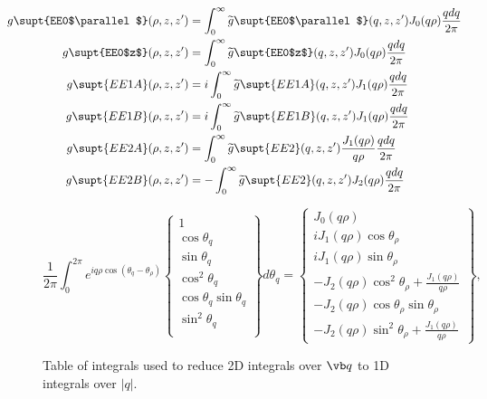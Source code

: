 \documentclass[letterpaper]{article}
\renewcommand{\wt}{\widetilde}
\begin{document}
\begin{align*}
g\supt{EE0$\parallel$}(\rho,z,z^\prime)
&= \int_0^\infty
   \wt{g}\supt{EE0$\parallel$}(q, z, z^\prime)
   J_0(q\rho) \frac{q dq}{2\pi}
\\
g\supt{EE0$z$}(\rho,z,z^\prime)
&=\int_0^\infty 
  \wt{g}\supt{EE0$z$}(q, z, z^\prime) J_0(q\rho) \frac{q dq}{2\pi} 
\\
g\supt{EE1A}(\rho,z,z^\prime)
&= i\int_0^\infty
   \wt{g}\supt{EE1A}(q, z, z^\prime)
   J_1(q\rho) \frac{q dq}{2\pi}
\\
g\supt{EE1B}(\rho,z,z^\prime)
&= i\int_0^\infty
   \wt{g}\supt{EE1B}(q, z, z^\prime)
   J_1(q\rho) \frac{q dq}{2\pi}
\\
g\supt{EE2A}(\rho,z,z^\prime)
&= \int_0^\infty
   \wt{g}\supt{EE2}(q, z, z^\prime)
   \frac{J_1(q\rho)}{q\rho} \frac{q dq}{2\pi}
\\
g\supt{EE2B}(\rho,z,z^\prime)
&= -\int_0^\infty
    \wt{g}\supt{EE2}(q, z, z^\prime)
    J_2(q\rho) \frac{q dq}{2\pi}
\end{align*}

\begin{figure}
$$
 \frac{1}{2\pi} 
 \int_0^{2\pi} e^{i q \rho \cos(\theta_q -\theta_\rho)}
 \left\{\begin{array}{c}
 1 \\[5pt]
 \cos\theta_q \\[5pt]
 \sin\theta_q \\[5pt]
 \cos^2\theta_q \\[5pt]
 \cos\theta_q \sin\theta_q \\[5pt]
 \sin^2\theta_q \\
 \end{array}\right\}
 d\theta_q 
= \left\{ \begin{array}{l}
    J_0 (q\rho)                           \\[5pt]
    i J_1(q\rho) \cos \theta_\rho          \\[5pt]
    i J_1(q\rho) \sin \theta_\rho          \\[5pt]
    - J_2(q\rho) \cos^2\theta_\rho + \frac{J_1(q\rho)}{q\rho} \\[5pt]
    -J_2(q\rho) \cos\theta_\rho \sin \theta_\rho              \\[5pt]
    - J_2(q\rho) \sin^2 \theta_\rho + \frac{J_1(q\rho)}{q\rho} 
  \end{array}\right\},
$$
\caption{Table of integrals used to reduce 2D integrals over $\vb q$ to
         1D integrals over $|q|$.}
\label{BesselIntegralTable}
\end{figure}
\end{document}
